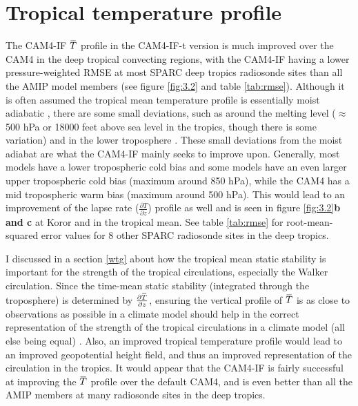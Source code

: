 \documentclass[letterpaper,12pt,titlepage,oneside,final]{book}
\newcommand{\overbar}[1]{\mkern 1.5mu\overline{\mkern-1.5mu#1\mkern-1.5mu}\mkern 1.5mu}
\begin{document}
\section{Tropical temperature profile}

The CAM4-IF $\overbar{T}$ profile in the CAM4-IF-t version is much improved over the CAM4 in the deep tropical convecting regions, with the CAM4-IF having a lower pressure-weighted RMSE at most SPARC deep tropics radiosonde sites than all the AMIP model members (see figure \ref{fig:3.2} and table \ref{tab:rmse}). Although it is often assumed the tropical mean temperature profile is essentially moist adiabatic \citep{emanuel_quasi-equilibrium_2007}, there are some small deviations, such as around the melting level ($\approx$ 500 hPa or 18000 feet above sea level in the tropics, though there is some variation) and in the lower troposphere \citep{folkins_melting_2013}. These small deviations from the moist adiabat are what the CAM4-IF mainly seeks to improve upon. Generally, most models have a lower tropospheric cold bias and some models have an even larger upper tropospheric cold bias (maximum around 850 hPa), while the CAM4 has a mid tropospheric warm bias (maximum around 500 hPa). This would lead to an improvement of the lapse rate ($\frac{\partial{T}}{\partial{z}}$) profile as well and is seen in figure \ref{fig:3.2}\textbf{b and c} at Koror and in the tropical mean. See table \ref{tab:rmse} for root-mean-squared error values for 8 other SPARC radiosonde sites in the deep tropics.

I discussed in a section \ref{wtg} about how the tropical mean static stability is important for the strength of the tropical circulations, especially the Walker circulation. Since the time-mean static stability (integrated through the troposphere) is determined by $\frac{\partial{\overbar{T}}}{\partial{z}}$, ensuring the vertical profile of $\overbar{T}$ is as close to observations as possible in a climate model should help in the correct representation of the strength of the tropical circulations in a climate model (all else being equal) \citep{sohn_role_2016,mitas_recent_2006}. Also, an improved tropical temperature profile would lead to an improved geopotential height field, and thus an improved representation of the circulation in the tropics. It would appear that the CAM4-IF is fairly successful at improving the $\overbar{T}$ profile over the default CAM4, and is even better than all the AMIP members at many radiosonde sites in the deep tropics. 
\end{document}
